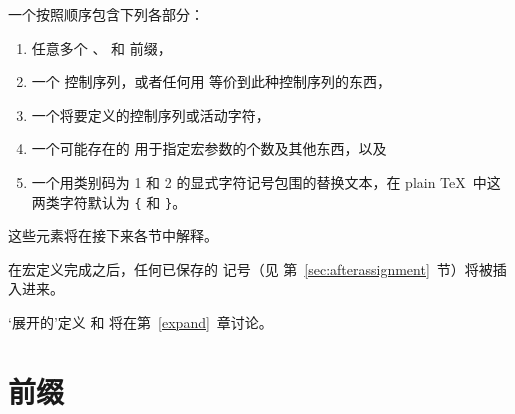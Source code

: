\documentclass[letterpaper]{book}
\begin{document}
一个按照顺序包含下列各部分：
\begin{enumerate}
\item 任意多个 、 和  前缀，
\item 一个  控制序列，或者任何用  等价到此种控制序列的东西，
\item 一个将要定义的控制序列或活动字符，
\item 一个可能存在的  用于指定宏参数的个数及其他东西，以及
\item 一个用类别码为 1 和 2
的显式字符记号包围的替换文本，在 plain \TeX\ 中这两类字符默认为
\verb-{- 和 \verb-}-。
\end{enumerate}
这些元素将在接下来各节中解释。

在宏定义完成之后，任何已保存的  记号（见
第~\ref{sec:afterassignment}~节）将被插入进来。

`展开的'定义  和  将在第~\ref{expand}~章讨论。

\section{前缀}
\end{document}
